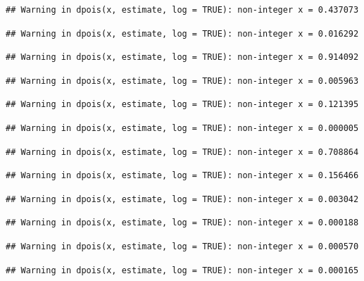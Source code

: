 \documentclass[]{article}
\begin{document}
\begin{verbatim}
## Warning in dpois(x, estimate, log = TRUE): non-integer x = 0.437073
\end{verbatim}

\begin{verbatim}
## Warning in dpois(x, estimate, log = TRUE): non-integer x = 0.016292
\end{verbatim}

\begin{verbatim}
## Warning in dpois(x, estimate, log = TRUE): non-integer x = 0.914092
\end{verbatim}

\begin{verbatim}
## Warning in dpois(x, estimate, log = TRUE): non-integer x = 0.005963
\end{verbatim}

\begin{verbatim}
## Warning in dpois(x, estimate, log = TRUE): non-integer x = 0.121395
\end{verbatim}

\begin{verbatim}
## Warning in dpois(x, estimate, log = TRUE): non-integer x = 0.000005
\end{verbatim}

\begin{verbatim}
## Warning in dpois(x, estimate, log = TRUE): non-integer x = 0.708864
\end{verbatim}

\begin{verbatim}
## Warning in dpois(x, estimate, log = TRUE): non-integer x = 0.156466
\end{verbatim}

\begin{verbatim}
## Warning in dpois(x, estimate, log = TRUE): non-integer x = 0.003042
\end{verbatim}

\begin{verbatim}
## Warning in dpois(x, estimate, log = TRUE): non-integer x = 0.000188
\end{verbatim}

\begin{verbatim}
## Warning in dpois(x, estimate, log = TRUE): non-integer x = 0.000570
\end{verbatim}

\begin{verbatim}
## Warning in dpois(x, estimate, log = TRUE): non-integer x = 0.000165
\end{verbatim}
\end{document}
